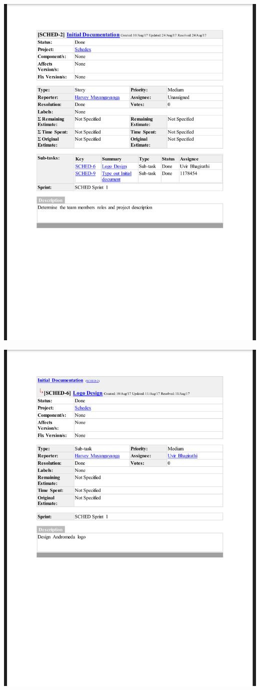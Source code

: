 \documentclass{article}
\begin{document}
\centerline{\includegraphics[scale=0.4]{sprint1_2}}

\centerline{\includegraphics[scale=0.4]{sprint1_3}}
\end{document}
